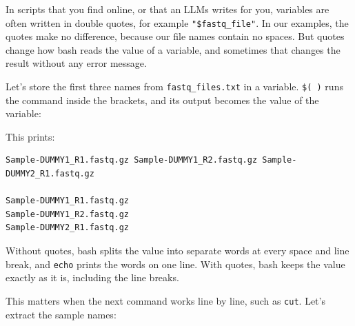 \documentclass[
  letterpaper,
  DIV=11,
  numbers=noendperiod]{scrreprt}
\newenvironment{Shaded}{}{}
\newcommand{\AttributeTok}[1]{\textcolor[rgb]{0.84,0.23,0.29}{#1}}
\newcommand{\BuiltInTok}[1]{\textcolor[rgb]{0.84,0.23,0.29}{#1}}
\newcommand{\CommentTok}[1]{\textcolor[rgb]{0.42,0.45,0.49}{#1}}
\newcommand{\FunctionTok}[1]{\textcolor[rgb]{0.44,0.26,0.76}{#1}}
\newcommand{\NormalTok}[1]{\textcolor[rgb]{0.14,0.16,0.18}{#1}}
\newcommand{\OperatorTok}[1]{\textcolor[rgb]{0.14,0.16,0.18}{#1}}
\newcommand{\StringTok}[1]{\textcolor[rgb]{0.01,0.18,0.38}{#1}}
\newcommand{\VariableTok}[1]{\textcolor[rgb]{0.89,0.38,0.04}{#1}}
\begin{document}
\begin{tcolorbox}[enhanced jigsaw, coltitle=black, breakable, titlerule=0mm, colback=white, rightrule=.15mm, bottomrule=.15mm, toprule=.15mm, colframe=quarto-callout-tip-color-frame, colbacktitle=quarto-callout-tip-color!10!white, bottomtitle=1mm, opacitybacktitle=0.6, toptitle=1mm, leftrule=.75mm, arc=.35mm, title=\textcolor{quarto-callout-tip-color}{\faLightbulb}\hspace{0.5em}{Tip: Quotes (optional)}, left=2mm, opacityback=0]

In scripts that you find online, or that an LLMs writes for you,
variables are often written in double quotes, for example
\texttt{"\$fastq\_file"}. In our examples, the quotes make no
difference, because our file names contain no spaces. But quotes change
how bash reads the value of a variable, and sometimes that changes the
result without any error message.

Let's store the first three names from \texttt{fastq\_files.txt} in a
variable. \texttt{\$(\ )} runs the command inside the brackets, and its
output becomes the value of the variable:

\begin{Shaded}
\end{Shaded}

This prints:

\begin{verbatim}
Sample-DUMMY1_R1.fastq.gz Sample-DUMMY1_R2.fastq.gz Sample-DUMMY2_R1.fastq.gz

Sample-DUMMY1_R1.fastq.gz
Sample-DUMMY1_R2.fastq.gz
Sample-DUMMY2_R1.fastq.gz
\end{verbatim}

Without quotes, bash splits the value into separate words at every space
and line break, and \texttt{echo} prints the words on one line. With
quotes, bash keeps the value exactly as it is, including the line
breaks.

This matters when the next command works line by line, such as
\texttt{cut}. Let's extract the sample names:


\end{tcolorbox}
\end{document}
